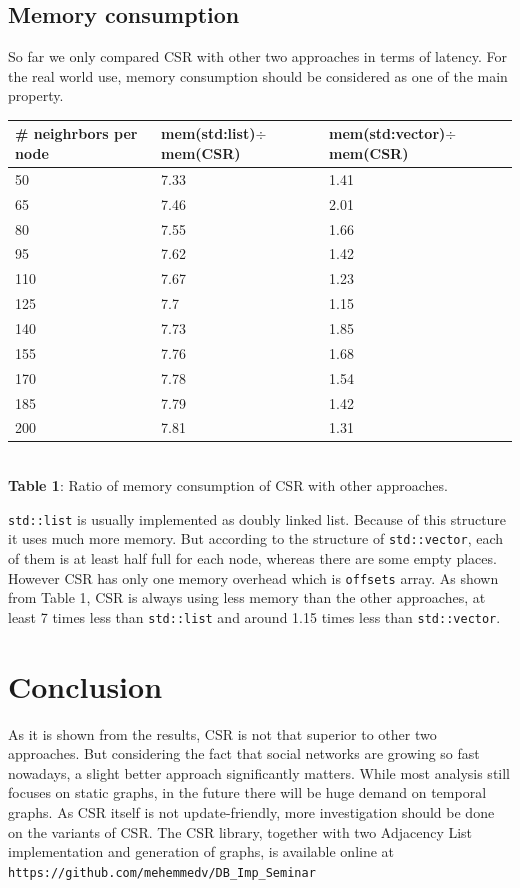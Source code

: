 \documentclass{article}
\begin{document}
\subsection{Memory consumption}
  So far we only compared CSR with other two approaches in terms of latency. For the real world use, memory consumption should be considered as one of the main property. 



\begin{center}
\begin{tabular}{ |p{2cm}||p{4cm}|p{4.5cm}|}
 \hline
\# neighrbors per node & mem(std:list)$\div$mem(CSR) & mem(std:vector)$\div$mem(CSR)\\
 \hline
 50   & 7.33&1.41\\
 65&   7.46  & 2.01  \\
 80 &7.55 & 1.66\\
 95    &7.62 & 1.42\\
 110&   7.67  & 1.23\\
 125& 7.7  & 1.15 \\
 140& 7.73  & 1.85\\
 155& 7.76  & 1.68\\
 170& 7.78  & 1.54\\
 185& 7.79  & 1.42\\
 200& 7.81  & 1.31\\
 \hline
\end{tabular}\\
\textbf{Table 1}: Ratio of memory consumption of CSR with other approaches.
\end{center}



\texttt{std::list} is usually implemented as doubly linked list. Because of this structure it uses much more memory. But according to the structure of \texttt{std::vector}, each of them is at least half full for each node, whereas there are some empty places. However CSR has only one memory overhead which is \texttt{offsets} array. As shown from Table 1, CSR is always using less memory than the other approaches, at least 7 times less than \texttt{std::list} and around 1.15 times less than \texttt{std::vector}.

\section{Conclusion}
As it is shown from the results, CSR is not that superior to other two approaches. But considering the fact that social networks are growing so fast nowadays, a slight better approach significantly matters. While most analysis still focuses on static graphs, in the future there will be huge demand on temporal graphs. As CSR itself is not update-friendly, more investigation should be done on the variants of CSR. The CSR library, together with two Adjacency List implementation and generation of graphs, is available online at \texttt{https://github.com/mehemmedv/DB\_Imp\_Seminar}\\
\end{document}
